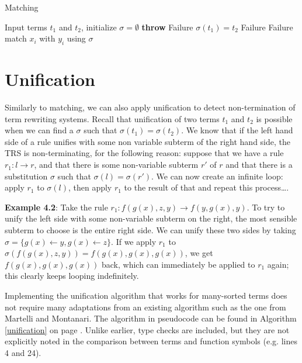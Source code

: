 \begin{algorithm}
\caption{Matching}
\label{matching}
\begin{algorithmic}[1]
\STATE Input terms $t_1$ and $t_2$, initialize $\sigma = \emptyset$
      \STATE \textbf{throw} Failure
    \ENDIF
  \ELSE
    \STATE $\sigma(t_1) = t_2$
  \ENDIF
{}
    \RETURN Failure
      \RETURN Failure
    \ENDIF
      \STATE match $x_i$ with $y_i$ using $\sigma$
    \ENDFOR
  \ENDIF
\ENDIF
\end{algorithmic}
\end{algorithm}

\section{Unification}
Similarly to matching, we can also apply unification to detect non-termination of term rewriting systems. Recall that unification of two terms $t_1$ and $t_2$ is possible when we can find a $\sigma$ such that $\sigma(t_1) = \sigma(t_2)$. We know that if the left hand side of a rule unifies with some non variable subterm of the right hand side, the TRS is non-terminating, for the following reason: suppose that we have a rule $r_1: l \rightarrow r$, and that there is some non-variable subterm $r'$ of $r$ and that there is a substitution $\sigma$ such that $\sigma(l) = \sigma(r')$. We can now create an infinite loop: apply $r_1$ to $\sigma(l)$, then apply $r_1$ to the result of that and repeat this process\dots.

\textbf{Example 4.2}: Take the rule $r_1: f(g(x), z, y) \rightarrow f(y, g(x), y)$. To try to unify the left side with some non-variable subterm on the right, the most sensible subterm to choose is the entire right side. We can unify these two sides by taking $\sigma = \{ g(x) \leftarrow y, g(x) \leftarrow z \}$. If we apply $r_1$ to $\sigma(f(g(x), z, y)) = f(g(x), g(x), g(x))$, we get $f(g(x), g(x), g(x))$ back, which can immediately be applied to $r_1$ again; this clearly keeps looping indefinitely.

Implementing the unification algorithm that works for many-sorted terms does not require many adaptations from an existing algorithm such as the one from Martelli and Montanari.\cite{Martelli:1982} The algorithm in pseudocode can be found in Algorithm \ref{unification} on page \pageref{unification}. Unlike earlier, type checks are included, but they are not explicitly noted in the comparison between terms and function symbols (e.g. lines 4 and 24).  

